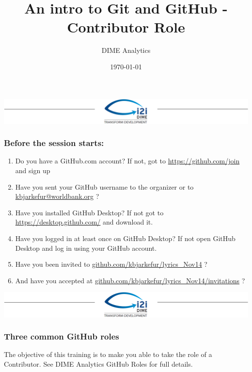 \documentclass[aspectratio=169]{beamer} %
\title{An intro to Git and GitHub - Contributor Role}
\author{DIME Analytics}
\institute{DECIE - The World Bank}
\date{\today}
\makeatletter
\newcommand{\trainingURL}[1]{{\color{blue}\url{#1}}}
\newcommand{\traininerUsername}{kbjarkefur}
\newcommand{\repoName}{\traininerUsername/lyrics\_Nov14}
\newcommand{\trainingRepoURL}[1]{\trainingURL{github.com/\repoName #1}}
\newcommand{\trainerEmail}{\trainingURL{kbjarkefur@worldbank.org} }
\makeatother
\begin{document}
\begin{frame}
\includegraphics[width=\textwidth]{../../Common-Resources/img/Header.png}
\vspace{-0.2cm}
\titlepage 	 %
\end{frame}

\begin{frame}
\frametitle{Before the session starts:}
	\begin{enumerate}
		\item Do you have a GitHub.com account? If not, got to \url{https://github.com/join} and sign up
		\item Have you sent your GitHub username to the organizer or to \trainerEmail?
		\item Have you installed GitHub Desktop? If not got to \trainingURL{https://desktop.github.com/} and download it.
		\item Have you logged in at least once on GitHub Desktop? If not open GitHub Desktop and log in using your GitHub account.
		\item Have you been invited to \trainingRepoURL{} ? 
		\item And have you accepted at \trainingRepoURL{/invitations} ? 
	\end{enumerate}

\end{frame}

\begin{frame}
\includegraphics[width=\textwidth]{../../Common-Resources/img/Header.png}
\vspace{-0.2cm}
\titlepage 	 %
\end{frame}

\begin{frame}
	\frametitle{Three common GitHub roles}
	
	\small The objective of this training is to make you able to take the role of a Contributor. See DIME Analytics GitHub Roles for full details.
	
	

\end{frame}
\end{document}

